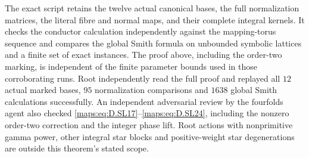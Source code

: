 The exact script 
retains the twelve actual canonical bases,
the full normalization matrices, the
literal fibre and normal maps, and their
complete integral kernels. It checks
the conductor calculation independently
against the mapping-torus sequence and
compares the global Smith formula on
unbounded symbolic lattices and a finite
set of exact instances. The proof above,
including the order-two marking, is
independent of the finite parameter
bounds used in those corroborating runs.
Root independently read the full proof and replayed all
$12$ actual marked bases, $95$ normalization comparisons
and $1638$ global Smith calculations successfully.
An independent adversarial review by the fourfolds
agent also checked \eqref{maps:eq:D.SL17}--\eqref{maps:eq:D.SL24}, including the
nonzero order-two correction and the integer phase lift.
Root actions with nonprimitive gamma
power, other integral star blocks and
positive-weight star degenerations are
outside this theorem's stated scope.


